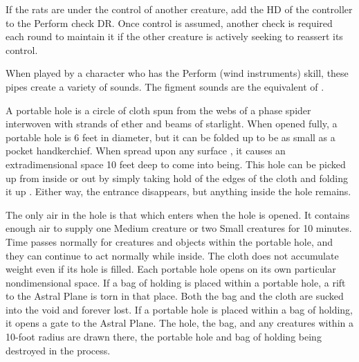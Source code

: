 {If the rats are under the control of another creature, add the HD of the controller to the Perform check DR. Once control is assumed, another check is required each round to maintain it if the other creature is actively seeking to reassert its control.


 When played by a character who has the Perform (wind instruments) skill, these pipes create a variety of sounds. The figment sounds are the equivalent of .


 A portable hole is a circle of cloth spun from the webs of a phase spider interwoven with strands of ether and beams of starlight. When opened fully, a portable hole is 6 feet in diameter, but it can be folded up to be as small as a pocket handkerchief. When spread upon any surface , it causes an extradimensional space 10 feet deep to come into being. This hole can be picked up from inside or out by simply taking hold of the edges of the cloth and folding it up . Either way, the entrance disappears, but anything inside the hole remains.

The only air in the hole is that which enters when the hole is opened. It contains enough air to supply one Medium creature or two Small creatures for 10 minutes. Time passes normally for creatures and objects within the portable hole, and they can continue to act normally while inside. The cloth does not accumulate weight even if its hole is filled. Each portable hole opens on its own particular nondimensional space. If a bag of holding is placed within a portable hole, a rift to the Astral Plane is torn in that place. Both the bag and the cloth are sucked into the void and forever lost. If a portable hole is placed within a bag of holding, it opens a gate to the Astral Plane. The hole, the bag, and any creatures within a 10-foot radius are drawn there, the portable hole and bag of holding being destroyed in the process.

}
